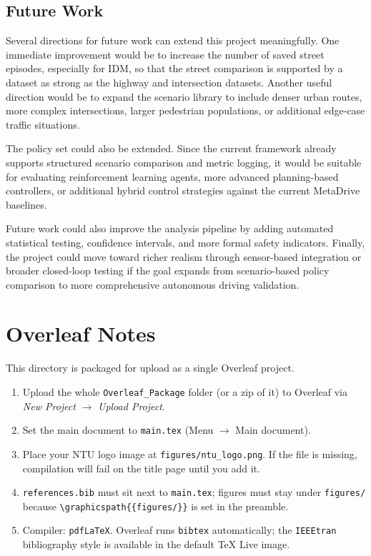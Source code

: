 \documentclass[12pt,a4paper]{report}
\begin{document}
\section{Future Work}
Several directions for future work can extend this project meaningfully. One immediate improvement would be to increase the number of saved street episodes, especially for IDM, so that the street comparison is supported by a dataset as strong as the highway and intersection datasets. Another useful direction would be to expand the scenario library to include denser urban routes, more complex intersections, larger pedestrian populations, or additional edge-case traffic situations.

The policy set could also be extended. Since the current framework already supports structured scenario comparison and metric logging, it would be suitable for evaluating reinforcement learning agents, more advanced planning-based controllers, or additional hybrid control strategies against the current MetaDrive baselines.

Future work could also improve the analysis pipeline by adding automated statistical testing, confidence intervals, and more formal safety indicators. Finally, the project could move toward richer realism through sensor-based integration or broader closed-loop testing if the goal expands from scenario-based policy comparison to more comprehensive autonomous driving validation.




\appendix
\chapter{Overleaf Notes}
This directory is packaged for upload as a single Overleaf project.
\begin{enumerate}[label=\arabic*.]
    \item Upload the whole \texttt{Overleaf\_Package} folder (or a zip of it) to Overleaf via \emph{New Project} $\rightarrow$ \emph{Upload Project}.
    \item Set the main document to \texttt{main.tex} (Menu $\rightarrow$ Main document).
    \item Place your NTU logo image at \texttt{figures/ntu\_logo.png}. If the file is missing, compilation will fail on the title page until you add it.
    \item \texttt{references.bib} must sit next to \texttt{main.tex}; figures must stay under \texttt{figures/} because \verb|\graphicspath{{figures/}}| is set in the preamble.
    \item Compiler: \texttt{pdfLaTeX}. Overleaf runs \texttt{bibtex} automatically; the \texttt{IEEEtran} bibliography style is available in the default TeX Live image.
\end{enumerate}
\end{document}
